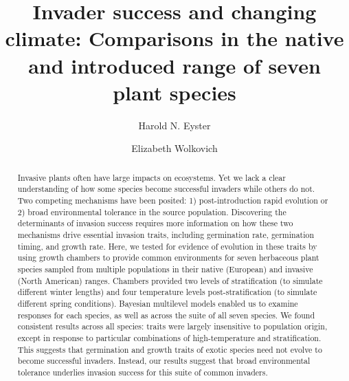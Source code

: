\documentclass[12pt]{article}\usepackage[]{graphicx}\usepackage[]{color}
\title{Invader success and changing climate: Comparisons in the native and introduced range of seven plant species}
\author[1]{Harold N. Eyster}
\author[2]{Elizabeth Wolkovich}
\affil[1]{Institute for Resources, Environment, and Sustainability, University of British Columbia}
\affil[2]{Department of Forest and Conservation Science, University of British Columbia}
\date{}                     %
\begin{document}
\maketitle

\begin{spacing}{1} %
	\begin{abstract} %
Invasive plants often have large impacts on ecosystems. Yet we lack a clear understanding of how some species become successful invaders while others do not. Two competing mechanisms have been posited: 1) post-introduction rapid evolution or 2) broad environmental tolerance in the source population. 
Discovering the determinants of invasion success requires more information on how these two mechanisms drive essential invasion traits, including germination rate, germination timing, and growth rate. 
Here, we tested for evidence of evolution in these traits by using growth chambers to provide common environments for seven herbaceous plant species sampled from multiple populations in their native (European) and invasive (North American) ranges. Chambers provided two levels of stratification (to simulate different winter lengths) and four temperature levels post-stratification (to simulate different spring conditions). Bayesian multilevel models enabled us to examine responses for each species, as well as across the suite of all seven species.
We found consistent results across all species: traits were largely insensitive to population origin, except in response to particular combinations of high-temperature and stratification. This suggests that germination and growth traits of exotic species need not evolve to become successful invaders. Instead, our results suggest that broad environmental tolerance underlies invasion success for this suite of common invaders. 
	\end{abstract}
\end{spacing}		
\end{document}
